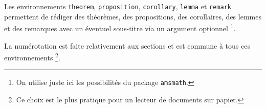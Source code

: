 Les environnements \verb+theorem+, \verb+proposition+, \verb+corollary+, \verb+lemma+ et \verb+remark+ permettent de rédiger des théorèmes, des propositions, des corollaires, des lemmes et des remarques avec un éventuel sous-titre via un argument optionnel
\footnote{
	On utilise juste ici les possibilités du package \texttt{amsmath}.
}.


\medskip


La numérotation est faite relativement aux sections et est commune à tous ces environnements
\footnote{
	Ce choix est le plus pratique pour un lecteur de documents sur papier.
}.
